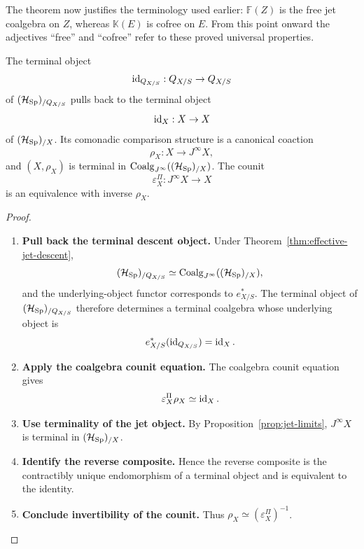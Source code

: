 The theorem now justifies the terminology used earlier:
\(\mathbb F(Z)\) is the free jet coalgebra on \(Z\), whereas
\(\mathbb K(E)\) is cofree on \(E\). From this point onward the adjectives
``free'' and ``cofree'' refer to these proved universal properties.

\begin{proposition}
The terminal object
\[
  \operatorname{id}_{Q_{X/S}}:Q_{X/S}\to Q_{X/S}
\]
of \((\mathcal H_{\operatorname{Sp}})_{/Q_{X/S}}\) pulls back to the terminal object
\[
  \operatorname{id}_X:X\to X
\]
of \((\mathcal H_{\operatorname{Sp}})_{/X}\). Its comonadic comparison structure is a canonical
coaction
\[
  \rho_X:X\longrightarrow J^\infty X,
\]
and \((X,\rho_X)\) is terminal in
\(\operatorname{Coalg}_{J^\infty}((\mathcal H_{\operatorname{Sp}})_{/X})\). The counit
\[
  \varepsilon^\Pi_X:J^\infty X\to X
\]
is an equivalence with inverse \(\rho_X\).
\end{proposition}

\begin{proof}
\leavevmode
\begin{enumerate}[label=\textup{(\arabic*)}]
    \item \textbf{Pull back the terminal descent object.}
Under Theorem~\ref{thm:effective-jet-descent},
\[
  (\mathcal H_{\operatorname{Sp}})_{/Q_{X/S}}
  \simeq
  \operatorname{Coalg}_{J^\infty}((\mathcal H_{\operatorname{Sp}})_{/X}),
\]
and the underlying-object functor corresponds to \(e_{X/S}^*\). The terminal
object of \((\mathcal H_{\operatorname{Sp}})_{/Q_{X/S}}\) therefore determines a terminal coalgebra whose
underlying object is
\[
  e_{X/S}^*(\operatorname{id}_{Q_{X/S}})=\operatorname{id}_X.
\]

    \item \textbf{Apply the coalgebra counit equation.}
The coalgebra counit equation gives
\[
  \varepsilon^\Pi_X\rho_X\simeq\operatorname{id}_X.
\]

    \item \textbf{Use terminality of the jet object.}
By Proposition~\ref{prop:jet-limits}, \(J^\infty X\) is terminal in
\((\mathcal H_{\operatorname{Sp}})_{/X}\).

    \item \textbf{Identify the reverse composite.}
Hence the reverse composite is the contractibly unique
endomorphism of a terminal object and is equivalent to the identity.

    \item \textbf{Conclude invertibility of the counit.}
Thus
\(\rho_X\simeq\left(\varepsilon^\Pi_X\right)^{-1}\).
\end{enumerate}
\end{proof}

